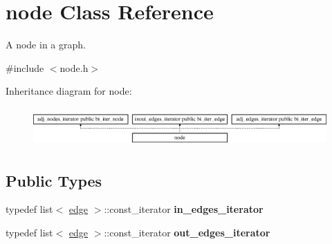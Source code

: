 \hypertarget{classnode}{}\section{node Class Reference}
\label{classnode}


A node in a graph.  




{\ttfamily \#include $<$node.\+h$>$}

Inheritance diagram for node\+:\begin{figure}[H]
\begin{center}
\leavevmode
\includegraphics[height=1.499331cm]{classnode}
\end{center}
\end{figure}
\subsection*{Public Types}
\begin{DoxyCompactItemize}
\item 
\mbox{\label{classnode_a3576579529747e88ab7d1a8ba3122f2e}} 
typedef list$<$ \mbox{\hyperlink{classedge}{edge}} $>$\+::const\+\_\+iterator {\bfseries in\+\_\+edges\+\_\+iterator}
\item 
\mbox{\label{classnode_a4715326ede44c91e24aba42f49089da4}} 
typedef list$<$ \mbox{\hyperlink{classedge}{edge}} $>$\+::const\+\_\+iterator {\bfseries out\+\_\+edges\+\_\+iterator}
\end{DoxyCompactItemize}
